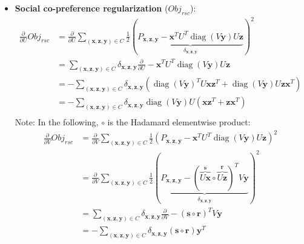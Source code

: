 \documentclass[11pt,a4paper]{article}
\newcommand{\Obj}{\mathit{Obj}}
\newcommand{\rsc}{\mathit{rsc}}
\newcommand{\tr}{\operatorname{tr}}
\newcommand{\diag}{\operatorname{diag}}
\newcommand{\x}{\vec{x}}
\newcommand{\y}{\vec{y}}
\newcommand{\z}{\vec{z}}
\renewcommand{\r}{\vec{r}}
\newcommand{\s}{\vec{s}}
\renewcommand{\vec}[1]{\mathbf{#1}}
\newcommand{\subfive}{\hspace{2.5mm}}
\begin{document}
\begin{itemize}
\item {\bf Social co-preference regularization} ($\Obj_\rsc$):
\begin{align*}
\frac{\partial}{\partial U} \Obj_\rsc & = \frac{\partial}{\partial U} \sum_{(\x,\z,\y) \in C} \frac{1}{2} \left( \underbrace{P_{\x,\z,\y} - \x^T U^T \diag(V\y) U \z}_{\delta_{\x,\z,\y}} \right)^2\\
& = \sum_{(\x,\z,\y) \in C} \delta_{\x,\z,\y} \frac{\partial}{\partial U} - \x^T U^T \diag(V\y) U \z \\
& = - \sum_{(\x,\z,\y) \in C} \delta_{\x,\z,\y} (\diag(V\y)^T U \x \z^T + \diag(V\y) U \z \x^T)\\ %
& = - \sum_{(\x,\z,\y) \in C} \delta_{\x,\z,\y} \diag(V\y) U (\x \z^T + \z \x^T)\\
\end{align*}
\subfive Note: In the following, $\circ$ is the Hadamard elementwise product:
\begin{align*}
\frac{\partial}{\partial V} \Obj_\rsc & = \frac{\partial}{\partial V} \sum_{(\x,\z,\y) \in C} \frac{1}{2} (P_{\x,\z,\y} - \x^T U^T \diag(V\y) U \z)^2\\
 & = \frac{\partial}{\partial V} \sum_{(\x,\z,\y) \in C} \frac{1}{2} \left( \underbrace{P_{\x,\z,\y} -  (\overbrace{U\x}^\s \circ \overbrace{U\z}^\r)^T V\y}_{\delta_{\x,\z,\y}} \right)^2\\
 & = \sum_{(\x,\z,\y) \in C} \delta_{\x,\z,\y} \frac{\partial}{\partial V} - (\s \circ \r)^T V\y\\
 & = - \sum_{(\x,\z,\y) \in C} \delta_{\x,\z,\y} (\s \circ \r) \y^T
\end{align*}


\end{itemize}
\end{document}
